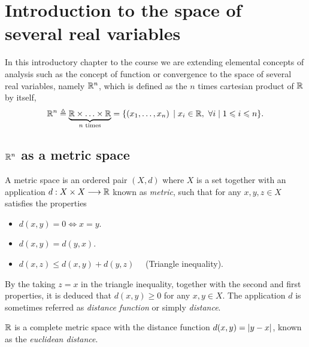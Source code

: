 \chapter[Introduction to the space of several real variables]{Introduction to the space of \\ several real variables}
\thispagestyle{noheaders}

In this introductory chapter to the course we are extending elemental concepts of analysis such as the concept of function or 
convergence to the space of several real variables, namely $\Rtn$, which is defined as the $n$ times cartesian product of $\R$ 
by itself,
\begin{equation}
\Rtn\bydef\underbrace{\R\times\ldots\times\R}_{n\textrm{ times}} = \{\left(x_1, \ldots, x_n\right)\st x_i\in\R,\ \forall i\st
1 \leq i \leq n\}.
\end{equation}

\section{$\Rtn$ as a metric space}



\begin{defn}
A metric space is an ordered pair $\left(X, d\right)$ where $X$ is a set together with an application 
$\appl{d}{X\times X}{\R}$ known as \textit{metric}, such that for any $x, y, z\in X$ satisfies the properties
\begin{itemize}[itemsep = -2pt]
	\item $d(x, y) = 0\iff x = y$.
	\item $d(x, y) = d(y, x)$.
	\item $d(x, z) \leq d(x, y) + d(y, z)\quad$ (Triangle inequality).
\end{itemize}
\end{defn}

By the taking $z = x$ in the triangle inequality, together with the second and first properties, it is deduced that $d(x, y)\geq 0$
for any $x, y\in X$. The application $d$ is sometimes referred as \textit{distance function} or simply \textit{distance}.

\begin{example}
	$\R$ is a complete metric space with the distance function $d(x, y) = \abs{y - x}$, known as the \textit{euclidean distance}.
\end{example}

